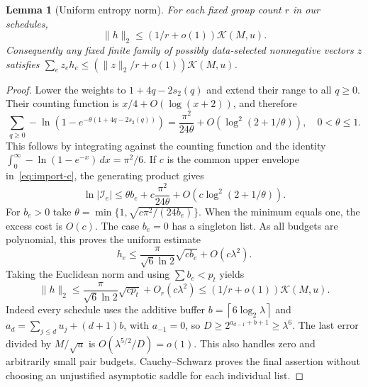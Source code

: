 \documentclass[11pt,letterpaper]{article}
\newtheorem{lemma}[theorem]{Lemma}
\theoremstyle{remark}\newtheorem{remark}[theorem]{Remark}
\newcommand{\ceil}[1]{\left\lceil #1\right\rceil}
\newcommand{\pc}{s_2}
\newcommand{\K}{\mathcal K}
\begin{document}
\begin{lemma}[Uniform entropy norm]\label{lem:norm}
For each fixed group count $r$ in our schedules,
\begin{equation}\label{eq:norm}
 \|h\|_2\le(1/r+o(1))\K(M,u).
\end{equation}
Consequently any fixed finite family of possibly data-selected
nonnegative vectors $z$ satisfies
$\sum_ez_eh_e\le(\|z\|_2/r+o(1))\K(M,u)$.
\end{lemma}
\begin{proof}
Lower the weights to $1+4q-2\pc(q)$ and extend their range to all
$q\ge0$. Their counting function is $x/4+O(\log(x+2))$, and therefore
\[
 \sum_{q\ge0}-\ln(1-e^{-\theta(1+4q-2\pc(q))})
 =\frac{\pi^2}{24\theta}+O(\log^2(2+1/\theta)),\quad 0<\theta\le1.
\]
This follows by integrating against the counting function and the
identity $\int_0^\infty-\ln(1-e^{-x})\,dx=\pi^2/6$.
If $c$ is the common upper envelope in~\eqref{eq:import-c}, the
generating product gives
\[
 \ln|\mathcal I_e|\le\theta b_e+c\frac{\pi^2}{24\theta}
       +O(c\log^2(2+1/\theta)).
\]
For $b_e>0$ take
$\theta=\min\{1,\sqrt{c\pi^2/(24b_e)}\}$. When the minimum equals
one, the excess cost is $O(c)$. The case $b_e=0$ has a singleton list.
As all budgets are polynomial, this proves the uniform estimate
\[
 h_e\le\frac\pi{\sqrt6\ln2}\sqrt{c b_e}+O(c\lambda^2).
\]
Taking the Euclidean norm and using $\sum b_e<p_t$ yields
\[
 \|h\|_2\le\frac\pi{\sqrt6\ln2}\sqrt{c p_t}+O_r(c\lambda^2)
 \le(1/r+o(1))\K(M,u).
\]
Indeed every schedule uses the additive buffer
$b=\ceil{6\log_2\lambda}$ and
$a_d=\sum_{j\le d}u_j+(d+1)b$, with $a_{-1}=0$, so
$D\ge2^{a_{d-1}+b+1}\ge\lambda^6$. The last error divided by
$M/\sqrt u$ is $O(\lambda^{5/2}/D)=o(1)$. This also handles zero
and arbitrarily small pair budgets. Cauchy--Schwarz proves the final
assertion without choosing an unjustified asymptotic saddle for each
individual list.
\end{proof}






\end{document}

